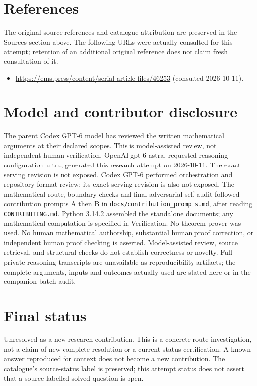 \documentclass[11pt]{article}
\begin{document}
\section{References}
The original source references and catalogue attribution are preserved in the
Sources section above. The following URLs were actually consulted for this attempt;
retention of an additional original reference does not claim fresh consultation of it.
\begin{itemize}
\item \url{https://ems.press/content/serial-article-files/46253} (consulted 2026-10-11). 
\end{itemize}
\section{Model and contributor disclosure}
The parent Codex GPT-6 model has reviewed the written mathematical arguments at their declared scopes. This is model-assisted review, not independent human verification.
OpenAI gpt-6-astra, requested reasoning configuration ultra, generated this research
attempt on 2026-10-11. The exact serving revision is not exposed. Codex GPT-6
performed orchestration and repository-format review; its exact serving revision
is also not exposed. The mathematical route, boundary checks and final adversarial
self-audit followed contribution prompts A then B in
\texttt{docs/contribution\_prompts.md}, after reading \texttt{CONTRIBUTING.md}.
Python 3.14.2 assembled the standalone documents; any mathematical computation is
specified in Verification. No theorem prover was used. No human mathematical
authorship, substantial human proof correction, or independent human proof checking
is asserted. Model-assisted review, source retrieval, and structural checks do not
establish correctness or novelty. Full private reasoning transcripts are unavailable
as reproducibility artifacts; the complete arguments, inputs and outcomes actually
used are stated here or in the companion batch audit.
\section{Final status}
Unresolved as a new research contribution. This is a concrete route investigation,
not a claim of new complete resolution or a current-status certification. A known
answer reproduced for context does not become a new contribution. The catalogue's
source-status label is preserved; this attempt status does not assert that a
source-labelled solved question is open.
\end{document}
